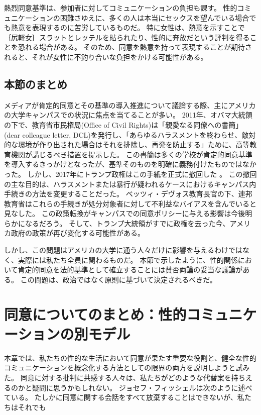 \documentclass[paper=a4,book,openany]{jlreq}
\newcommand{\ig}[1]{}           %
\begin{document}
熱烈同意基準は、参加者に対してコミュニケーションの負担も課す。
性的コミュニケーションの困難さゆえに、多くの人は本当にセックスを望んでいる場合でも熱意を表現するのに苦労しているものだ。
特に女性は、熱意を示すことで｛尻軽女｝{スラット}とレッテルを貼られたり、性的に奔放だという評判を得ることを恐れる場合がある。
そのため、同意を熱意を持って表現することが期待されると、それが女性に不釣り合いな負担をかける可能性がある。

\subsection{本節のまとめ}

メディアが肯定的同意とその基準の導入推進について議論する際、主にアメリカの大学キャンパスでの状況に焦点を当てることが多い。
2011年、オバマ大統領の下で、教育省市民権局(Office of Civil Rights)は「親愛なる同僚への書簡」(dear colleague letter, DCL)を発行し、「あらゆるハラスメントを終わらせ、敵対的な環境が作り出された場合はそれを排除し、再発を防止する」ために、高等教育機関が講じるべき措置を提示した。
この書簡は多くの学校が肯定的同意基準を導入するきっかけとなったが、基準そのものを明確に義務付けたものではなかった。
しかし、2017年にトランプ政権はこの手紙を正式に撤回した
\citep{melnick20:_analy_depar_educat_final_title}。
この撤回の主な目的は、ハラスメントまたは暴行が疑われるケースにおけるキャンパス内手続きの方法を変更することだった。
ベッツィ・デヴォス\ig{Betsy DeVos}教育長官の下、連邦教育省はこれらの手続きが処分対象者に対して不利益なバイアスを含んでいると見なした。
この政策転換がキャンパスでの同意ポリシーに与える影響は今後明らかになるだろう。
そして、トランプ大統領がすでに政権を去った今、アメリカ政府の政策が再び変化する可能性がある。

しかし、この問題はアメリカの大学に通う人々だけに影響を与えるわけではなく、実際には私たち全員に関わるものだ。
本節で示したように、性的関係において肯定的同意を法的基準として確立することには賛否両論の妥当な議論がある。
この問題は、政治ではなく原則に基づいて決定されるべきだ。

\section{同意についてのまとめ：性的コミュニケーションの別モデル}

本章では、私たちの性的な生活において同意が果たす重要な役割と、健全な性的コミュニケーションを概念化する方法としての限界の両方を説明しようと試みた。
同意に対する批判に共感する人々は、私たちがどのような代替案を持ちえるのかと疑問に思うかもしれない。
ジョセフ・フィッシェル\ig{Joseph Fischel}は次のように述べている。
たしかに同意に関する会話をすべて放棄することはできないが、私たちはそれでも
\end{document}
